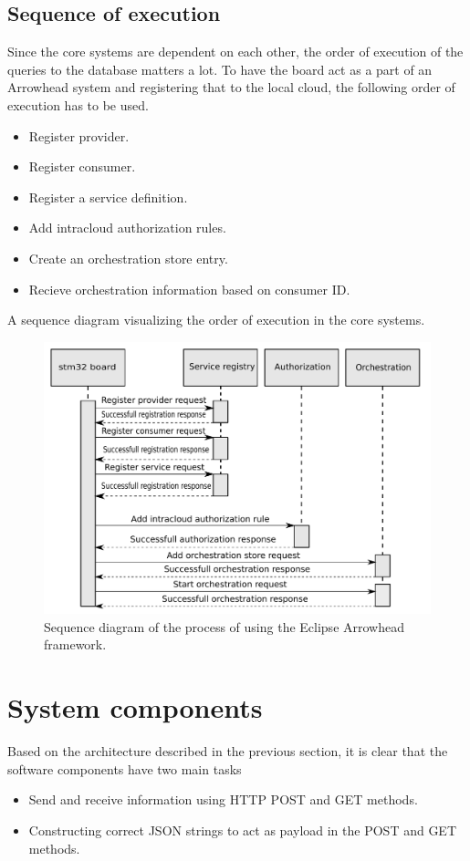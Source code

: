 \subsection{Sequence of execution}
Since the core systems are dependent on each other, the order of execution of the queries to the database matters a lot.
To have the board act as a part of an Arrowhead system and registering that to the local cloud, the following order of execution has to be used.
\begin{itemize}
    \item Register provider.
    \item Register consumer.
    \item Register a service definition.
    \item Add intracloud authorization rules.
    \item Create an orchestration store entry.
    \item Recieve orchestration information based on consumer ID.
\end{itemize}
A sequence diagram visualizing the order of execution in the core systems.
\begin{figure}[H]
    \centering
    \includegraphics[width=\textwidth]{Pictures/sequence_diagram_total.pdf} 
    \caption{Sequence diagram of the process of using the Eclipse Arrowhead framework.}
    \label{sequence diagram whole process}
\end{figure}

\section{System components}
Based on the architecture described in the previous section, it is clear that the software components have two main tasks
\begin{itemize}
    \item Send and receive information using HTTP POST and GET methods.
    \item Constructing correct JSON strings to act as payload in the POST and GET methods. 
\end{itemize}
